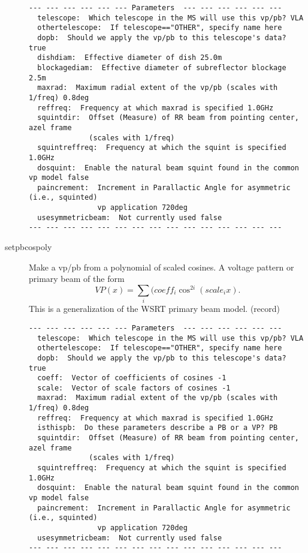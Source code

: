 \documentclass[12pt]{article}
\begin{document}
\begin{description}
{\small
\begin{verbatim}
--- --- --- --- --- --- Parameters  --- --- --- --- --- ---
  telescope:  Which telescope in the MS will use this vp/pb? VLA 
  othertelescope:  If telescope=="OTHER", specify name here 
  dopb:  Should we apply the vp/pb to this telescope's data? true 
  dishdiam:  Effective diameter of dish 25.0m 
  blockagediam:  Effective diameter of subreflector blockage 2.5m 
  maxrad:  Maximum radial extent of the vp/pb (scales with 1/freq) 0.8deg 
  reffreq:  Frequency at which maxrad is specified 1.0GHz 
  squintdir:  Offset (Measure) of RR beam from pointing center, azel frame 
              (scales with 1/freq) 
  squintreffreq:  Frequency at which the squint is specified 1.0GHz 
  dosquint:  Enable the natural beam squint found in the common vp model false 
  paincrement:  Increment in Parallactic Angle for asymmetric (i.e., squinted) 
                vp application 720deg 
  usesymmetricbeam:  Not currently used false 
--- --- --- --- --- --- --- --- --- --- --- --- --- --- ---
\end{verbatim} 
} 


  \item[setpbcospoly]
   Make a vp/pb from a polynomial of scaled cosines.
   A voltage pattern or primary beam of the form
   \begin{equation}
     VP(x) = \sum_{i} ( coeff_{i} \cos^{2i}( scale_{i} x).
   \end{equation}
   This is a generalization of the WSRT primary beam model. (record)
{\small
\begin{verbatim}
--- --- --- --- --- --- Parameters  --- --- --- --- --- ---
  telescope:  Which telescope in the MS will use this vp/pb? VLA 
  othertelescope:  If telescope=="OTHER", specify name here 
  dopb:  Should we apply the vp/pb to this telescope's data? true 
  coeff:  Vector of coefficients of cosines -1
  scale:  Vector of scale factors of cosines -1 
  maxrad:  Maximum radial extent of the vp/pb (scales with 1/freq) 0.8deg 
  reffreq:  Frequency at which maxrad is specified 1.0GHz 
  isthispb:  Do these parameters describe a PB or a VP? PB 
  squintdir:  Offset (Measure) of RR beam from pointing center, azel frame 
              (scales with 1/freq) 
  squintreffreq:  Frequency at which the squint is specified 1.0GHz 
  dosquint:  Enable the natural beam squint found in the common vp model false 
  paincrement:  Increment in Parallactic Angle for asymmetric (i.e., squinted)
                vp application 720deg 
  usesymmetricbeam:  Not currently used false 
--- --- --- --- --- --- --- --- --- --- --- --- --- --- ---
\end{verbatim} 
} 


\end{description}
\end{document}
